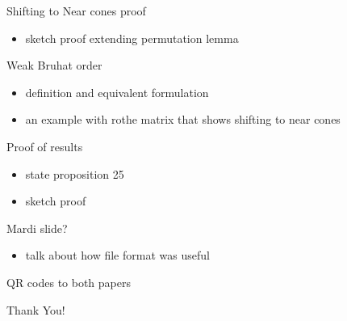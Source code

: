 \documentclass[9pt]{beamer}
\theoremstyle{definition}
\begin{document}
\begin{frame}[fragile]{Shifting to Near cones proof}
  \begin{itemize}
  \item sketch proof extending permutation lemma
  \end{itemize}
\end{frame}


\begin{frame}[fragile]{Weak Bruhat order}
  \begin{itemize}
  \item definition and equivalent formulation
  \item an example with rothe matrix that shows shifting to near cones
  \end{itemize}
\end{frame}


\begin{frame}[fragile]{Proof of results}
  \begin{itemize}
  \item state proposition 25
  \item sketch proof
  \end{itemize}
\end{frame}



\begin{frame}[fragile]{Mardi slide?}
  \begin{itemize}
  \item talk about how file format was useful
  \end{itemize}
\end{frame}


\begin{frame}[fragile]{}
  \begin{center}
    QR codes to both papers

    Thank You!
  \end{center}
\end{frame}

\end{document}
